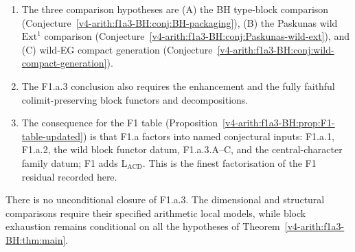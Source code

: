 \begin{enumerate}
twisted DEG-type functor.
\item The three comparison hypotheses are (A) the BH type-block
comparison (Conjecture~\ref{v4-arith:f1a3-BH:conj:BH-packaging}),
(B) the Paskunas wild \(\mathrm{Ext}^1\) comparison
(Conjecture~\ref{v4-arith:f1a3-BH:conj:Paskunas-wild-ext}), and
(C) wild-EG compact generation
(Conjecture~\ref{v4-arith:f1a3-BH:conj:wild-compact-generation}).
\item The F1.a.3 conclusion also requires the enhancement and the
fully faithful colimit-preserving block functors and decompositions.
\item The consequence for the F1 table
(Proposition~\ref{v4-arith:f1a3-BH:prop:F1-table-updated}) is that F1.a factors
into named conjectural inputs: F1.a.1, F1.a.2, the wild block
functor datum, F1.a.3.A--C, and the central-character family datum;
F1 adds \(\mathrm{L}_{\mathrm{ACD}}\). This is the finest
factorisation of the F1 residual recorded here.
\end{enumerate}

There is no unconditional closure of F1.a.3. The dimensional and structural comparisons require their
specified arithmetic local models, while block exhaustion remains
conditional on all the hypotheses of
Theorem~\ref{v4-arith:f1a3-BH:thm:main}.
